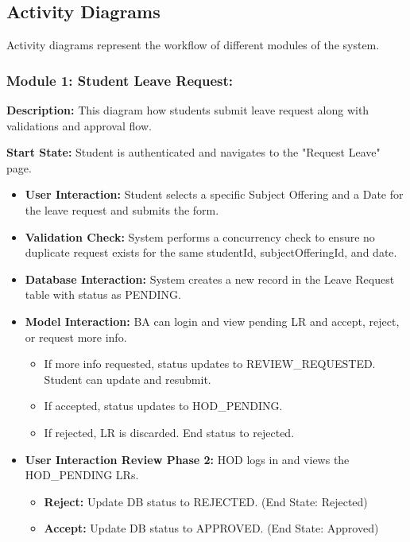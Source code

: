 \subsection{Activity Diagrams}

Activity diagrams represent the workflow of different modules of the system.

\subsubsection{Module 1: Student Leave Request:}

\textbf{Description:}
This diagram how students submit leave request along with validations and approval flow.

\textbf{Start State:} Student is authenticated and navigates to the "Request Leave" page.

\begin{itemize}

    \item \textbf{User Interaction:} Student selects a specific Subject Offering and a Date for the leave request and submits the form.
    \item \textbf{Validation Check:} System performs a concurrency check to ensure no duplicate request exists for the same studentId, subjectOfferingId, and date.
    \item \textbf{Database Interaction:} System creates a new record in the Leave Request table with status as PENDING.
    \item \textbf{Model Interaction:} BA can login and view pending LR and accept, reject, or request more info.
    \begin{itemize}
        \item If more info requested, status updates to REVIEW\_REQUESTED. Student can update and resubmit.
        \item If accepted, status updates to HOD\_PENDING.
        \item If rejected, LR is discarded. End status to rejected.
    \end{itemize}

    \item \textbf{User Interaction Review Phase 2:} HOD logs in and views the HOD\_PENDING LRs. 
    \begin{itemize}
        \item \textbf{Reject:} Update DB status to REJECTED. (End State: Rejected)
        \item \textbf{Accept:} Update DB status to APPROVED. (End State: Approved)
    \end{itemize}

\end{itemize}

